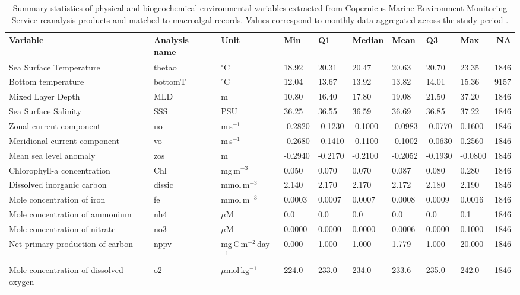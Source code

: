 \documentclass[a4paper,fleqn]{cas-sc}
\begin{document}
\begin{table}[width=\linewidth,cols=10,pos=!htbp]
\caption{Summary statistics of physical and biogeochemical environmental variables extracted from Copernicus Marine Environment Monitoring Service reanalysis products and matched to macroalgal records. Values correspond to monthly data aggregated across the study period \cite{CMEMS_BGC_IBI2024, CMEMS_PHY_IBI2024}.}
\small
\begin{tabular*}{\tblwidth}{@{} LLLLLLLLL R @{}}
\toprule
Variable & Analysis name & Unit & Min & Q1 & Median & Mean & Q3 & Max & NA \\
\midrule
Sea Surface Temperature & thetao & $^\circ$C & 18.92 & 20.31 & 20.47 & 20.63 & 20.70 & 23.35 & 1846 \\
Bottom temperature & bottomT & $^\circ$C & 12.04 & 13.67 & 13.92 & 13.82 & 14.01 & 15.36 & 9157 \\
Mixed Layer Depth & MLD & m & 10.80 & 16.40 & 17.80 & 19.08 & 21.50 & 37.20 & 1846 \\
Sea Surface Salinity & SSS & PSU & 36.25 & 36.55 & 36.59 & 36.69 & 36.85 & 37.22 & 1846 \\
Zonal current component & uo & m\,s$^{-1}$ & -0.2820 & -0.1230 & -0.1000 & -0.0983 & -0.0770 & 0.1600 & 1846 \\
Meridional current component & vo & m\,s$^{-1}$ & -0.2680 & -0.1410 & -0.1100 & -0.1002 & -0.0630 & 0.2560 & 1846 \\
Mean sea level anomaly & zos & m & -0.2940 & -0.2170 & -0.2100 & -0.2052 & -0.1930 & -0.0800 & 1846 \\
Chlorophyll-a concentration & Chl & mg\,m$^{-3}$ & 0.050 & 0.070 & 0.070 & 0.087 & 0.080 & 0.280 & 1846 \\
Dissolved inorganic carbon & dissic & mmol\,m$^{-3}$ & 2.140 & 2.170 & 2.170 & 2.172 & 2.180 & 2.190 & 1846 \\
Mole concentration of iron & fe & mmol\,m$^{-3}$ & 0.0003 & 0.0007 & 0.0007 & 0.0008 & 0.0009 & 0.0016 & 1846 \\
Mole concentration of ammonium & nh4 & $\mu$M & 0.0 & 0.0 & 0.0 & 0.0 & 0.0 & 0.1 & 1846 \\
Mole concentration of nitrate & no3 & $\mu$M & 0.0000 & 0.0000 & 0.0000 & 0.0006 & 0.0000 & 0.1000 & 1846 \\
Net primary production of carbon & nppv & mg\,C\,m$^{-2}$\,day$^{-1}$ & 0.000 & 1.000 & 1.000 & 1.779 & 1.000 & 20.000 & 1846 \\
Mole concentration of dissolved oxygen & o2 & $\mu$mol\,kg$^{-1}$ & 224.0 & 233.0 & 234.0 & 233.6 & 235.0 & 242.0 & 1846 \\

\end{tabular*}
\end{table}
\end{document}
